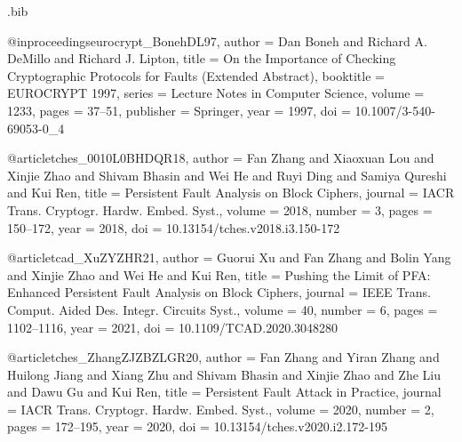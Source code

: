 \documentclass[table,aspectratio=169]{beamer}
\begin{document}
\begin{filecontents*}[overwrite]{\jobname.bib}

@inproceedings{eurocrypt_BonehDL97,
author    = {Dan Boneh and
				     Richard A. DeMillo and
				     Richard J. Lipton},
title     = {On the Importance of Checking Cryptographic Protocols for Faults (Extended
				Abstract)},
booktitle = {{EUROCRYPT} 1997},
series    = {Lecture Notes in Computer Science},
volume    = {1233},
pages     = {37--51},
publisher = {Springer},
year      = {1997},
doi       = {10.1007/3-540-69053-0_4}
}

@article{tches_0010L0BHDQR18,
  author    = {Fan Zhang and
               Xiaoxuan Lou and
               Xinjie Zhao and
               Shivam Bhasin and
               Wei He and
               Ruyi Ding and
               Samiya Qureshi and
               Kui Ren},
  title     = {Persistent Fault Analysis on Block Ciphers},
  journal   = {{IACR} Trans. Cryptogr. Hardw. Embed. Syst.},
  volume    = {2018},
  number    = {3},
  pages     = {150--172},
  year      = {2018},
  doi       = {10.13154/tches.v2018.i3.150-172}
}

@article{tcad_XuZYZHR21,
  author    = {Guorui Xu and
               Fan Zhang and
               Bolin Yang and
               Xinjie Zhao and
               Wei He and
               Kui Ren},
  title     = {Pushing the Limit of {PFA:} Enhanced Persistent Fault Analysis on
               Block Ciphers},
  journal   = {{IEEE} Trans. Comput. Aided Des. Integr. Circuits Syst.},
  volume    = {40},
  number    = {6},
  pages     = {1102--1116},
  year      = {2021},
  doi       = {10.1109/TCAD.2020.3048280}
}

@article{tches_ZhangZJZBZLGR20,
  author    = {Fan Zhang and
               Yiran Zhang and
               Huilong Jiang and
               Xiang Zhu and
               Shivam Bhasin and
               Xinjie Zhao and
               Zhe Liu and
               Dawu Gu and
               Kui Ren},
  title     = {Persistent Fault Attack in Practice},
  journal   = {{IACR} Trans. Cryptogr. Hardw. Embed. Syst.},
  volume    = {2020},
  number    = {2},
  pages     = {172--195},
  year      = {2020},
  doi       = {10.13154/tches.v2020.i2.172-195}
}

\end{filecontents*}
\end{document}
